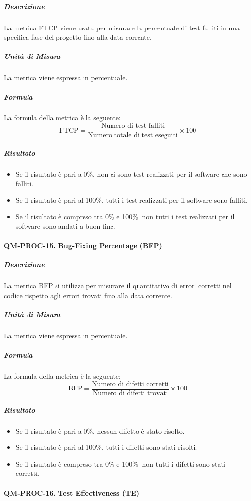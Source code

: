 			\subparagraph{Descrizione}
			La metrica FTCP viene usata per misurare la percentuale di test falliti in una specifica fase del progetto fino alla data corrente.

			\subparagraph{Unità di Misura}
			La metrica viene espressa in percentuale.

			\subparagraph{Formula}
			La formula della metrica è la seguente:
			\[
				\text{FTCP} = \frac{\text{Numero di test falliti}}{\text{Numero totale di test eseguiti}} \times 100
			\]

			\subparagraph{Risultato}
			\begin{itemize}
				\item Se il risultato è pari a 0\%, non ci sono test realizzati per il software che sono falliti.
				\item Se il risultato è pari al 100\%, tutti i test realizzati per il software sono falliti.
				\item Se il risultato è compreso tra 0\% e 100\%, non tutti i test realizzati per il software sono andati a buon fine.
			\end{itemize}

		\paragraph{QM-PROC-15. Bug-Fixing Percentage (BFP)}

			\subparagraph{Descrizione}
			La metrica BFP si utilizza per misurare il quantitativo di errori corretti nel codice rispetto agli errori trovati fino alla data corrente.

			\subparagraph{Unità di Misura}
			La metrica viene espressa in percentuale.

			\subparagraph{Formula}
			La formula della metrica è la seguente:
			\[
				\text{BFP} = \frac{\text{Numero di difetti corretti}}{\text{Numero di difetti trovati}} \times 100
			\]

			\subparagraph{Risultato}
			\begin{itemize}
				\item Se il risultato è pari a 0\%, nessun difetto è stato risolto.
				\item Se il risultato è pari al 100\%, tutti i difetti sono stati risolti.
				\item Se il risultato è compreso tra 0\% e 100\%, non tutti i difetti sono stati corretti.
			\end{itemize}

		\paragraph{QM-PROC-16. Test Effectiveness (TE)}

